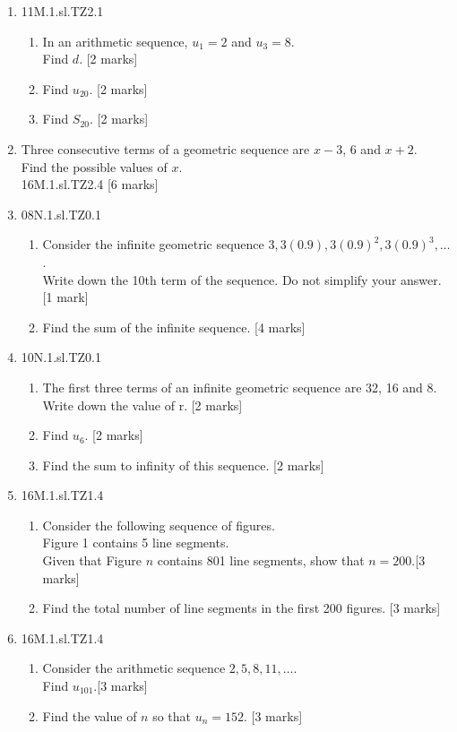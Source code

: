 \documentclass[12pt, twoside]{article}
\begin{document}
\begin{enumerate}
  \item 11M.1.sl.TZ2.1
  \begin{enumerate}
    \item In an arithmetic sequence, $u_1=2$ and $u_3=8$.\\
    Find $d$. [2 marks]
    \item Find $u_{20}$. [2 marks]
    \item Find $S_{20}$. [2 marks]
  \end{enumerate}

  \item Three consecutive terms of a geometric sequence are $x-3$, $6$ and $x+2$.\\
  Find the possible values of $x$.\\
  16M.1.sl.TZ2.4  [6 marks]

  \item 08N.1.sl.TZ0.1
  \begin{enumerate}
    \item Consider the infinite geometric sequence $3, 3(0.9), 3(0.9)^2, 3(0.9)^3,\dots$.\\
    Write down the 10th term of the sequence. Do not simplify your answer. [1 mark]
    \item Find the sum of the infinite sequence. [4 marks]
  \end{enumerate}

  \item 10N.1.sl.TZ0.1
  \begin{enumerate}
    \item The first three terms of an infinite geometric sequence are 32, 16 and 8.\\
    Write down the value of r. [2 marks]
    \item Find $u_6$. [2 marks]
    \item Find the sum to infinity of this sequence. [2 marks]
  \end{enumerate}

  \item 16M.1.sl.TZ1.4
  \begin{enumerate}
    \item Consider the following sequence of figures.\\
    Figure 1 contains 5 line segments.\\
    Given that Figure $n$ contains 801 line segments, show that $n=200$.[3 marks]
    \item Find the total number of line segments in the first 200 figures. [3 marks]
  \end{enumerate}

  \item 16M.1.sl.TZ1.4
  \begin{enumerate}
    \item Consider the arithmetic sequence $2, 5, 8, 11, \dots$.\\
    Find $u_{101}$.[3 marks]
    \item Find the value of $n$ so that $u_n = 152$. [3 marks]
  \end{enumerate}



  \newpage




\end{enumerate}
\end{document}
